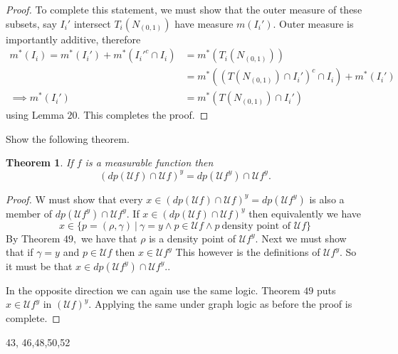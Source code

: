 \documentclass[letter]{article}
\newtheorem{theorem}{Theorem}
\newenvironment{menumerate}{%
  \edef\backupindent{\the\parindent}%
  \enumerate%
  \setlength{\parindent}{\backupindent}%
}{\endenumerate}
\begin{document}
\begin{menumerate}
\begin{proof}
        To complete this statement, we must show that the outer measure of these subsets, say $I_i'$ intersect $T_i(N_{(0,1)})$
        have measure $m(I_i').$  Outer measure is importantly additive, therefore 
        \begin{equation}
            \begin{aligned}
                 m^*(I_i) = m^*(I_i') + m^*({I_i'}^c\cap I_i) &= m^*(T_i(N_{(0,1)})) \\
                &= m^*((T(N_{(0,1)}) \cap I_i')^{c}\cap I_i) + m^*(I_i') \\
               \implies m^*(I_i') &= m^*(T(N_{(0,1)}) \cap I_i')
            \end{aligned}
        \end{equation}
        using Lemma $20$.
        This completes the proof.
    \end{proof} 
    \setcounter{enumi}{51}
    \item Show the following theorem.
    \begin{theorem}
        If $f$ is a measurable function then
        \begin{equation}
            (dp(\mathcal{U}f) \cap \mathcal{U}f)^y = dp(\mathcal{U}f^y) \cap \mathcal{U}f^y.
        \end{equation}    
     \end{theorem} 
     \begin{proof}
        W must show that every $x \in (dp(\mathcal{U}f) \cap \mathcal{U}f)^y = dp(\mathcal{U}f^y)$ is also a member of  $dp(\mathcal{U}f^y) \cap \mathcal{U}f^y.$
        If $x \in (dp(\mathcal{U}f) \cap \mathcal{U}f)^y$ then equivalently
        we have
        \begin{equation}
            x \in \{p = (\rho,\gamma) \ |\  \gamma = y \wedge p \in \mathcal{U}f \wedge p\ \text{density point of }\mathcal{U}f \}
          \end{equation}  
     By Theorem $49,$ we have that $\rho$ is a density point of $\mathcal{U}f^y$. Next we must show that if $\gamma = y$ and $p \in \mathcal{U}f$
     then $x \in \mathcal{U}f^y$ This however is the definitions of $\mathcal{U}f^y.$ So it must be that $x \in dp(\mathcal{U}f^y) \cap \mathcal{U}f^y.$.

     In the opposite direction we can again use the same logic. Theorem $49$
     puts $x \in \mathcal{U}f^y $ in $(\mathcal{U}f)^y.$ Applying the same under graph logic as before the proof is complete.
     \end{proof}
43, 46,48,50,52
\end{menumerate}
\end{document}
